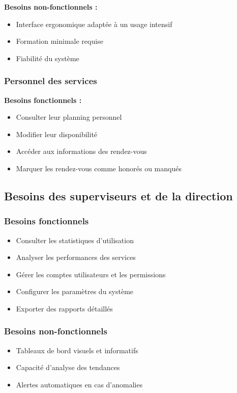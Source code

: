 \textbf{Besoins non-fonctionnels :}
\begin{itemize}
    \item Interface ergonomique adaptée à un usage intensif
    \item Formation minimale requise
    \item Fiabilité du système
\end{itemize}

\subsubsection{Personnel des services}
\textbf{Besoins fonctionnels :}
\begin{itemize}
    \item Consulter leur planning personnel
    \item Modifier leur disponibilité
    \item Accéder aux informations des rendez-vous
    \item Marquer les rendez-vous comme honorés ou manqués
\end{itemize}

\subsection{Besoins des superviseurs et de la direction}

\subsubsection{Besoins fonctionnels}
\begin{itemize}
    \item Consulter les statistiques d'utilisation
    \item Analyser les performances des services
    \item Gérer les comptes utilisateurs et les permissions
    \item Configurer les paramètres du système
    \item Exporter des rapports détaillés
\end{itemize}

\subsubsection{Besoins non-fonctionnels}
\begin{itemize}
    \item Tableaux de bord visuels et informatifs
    \item Capacité d'analyse des tendances
    \item Alertes automatiques en cas d'anomalies
\end{itemize}

